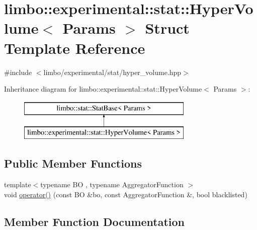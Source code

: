 \hypertarget{structlimbo_1_1experimental_1_1stat_1_1_hyper_volume}{}\section{limbo\+:\+:experimental\+:\+:stat\+:\+:Hyper\+Volume$<$ Params $>$ Struct Template Reference}
\label{structlimbo_1_1experimental_1_1stat_1_1_hyper_volume}


{\ttfamily \#include $<$limbo/experimental/stat/hyper\+\_\+volume.\+hpp$>$}

Inheritance diagram for limbo\+:\+:experimental\+:\+:stat\+:\+:Hyper\+Volume$<$ Params $>$\+:\begin{figure}[H]
\begin{center}
\leavevmode
\includegraphics[height=2.000000cm]{structlimbo_1_1experimental_1_1stat_1_1_hyper_volume}
\end{center}
\end{figure}
\subsection*{Public Member Functions}
\begin{DoxyCompactItemize}
\item 
{\footnotesize template$<$typename B\+O , typename Aggregator\+Function $>$ }\\void \hyperlink{structlimbo_1_1experimental_1_1stat_1_1_hyper_volume_ab3a05ba6796fde834b798d0330492346}{operator()} (const B\+O \&bo, const Aggregator\+Function \&, bool blacklisted)
\end{DoxyCompactItemize}


\subsection{Member Function Documentation}
\hypertarget{structlimbo_1_1experimental_1_1stat_1_1_hyper_volume_ab3a05ba6796fde834b798d0330492346}{}
